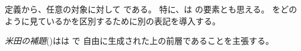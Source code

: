 \documentclass[index]{subfiles}
\begin{document}














定義から、任意の対象に対して
である。
特に、は
の要素とも思える。
をどのように見ているかを区別するために別の表記を導入する。



\emph{米田の補題}()はは
で
自由に生成された上の前層であることを主張する。


\end{document}
